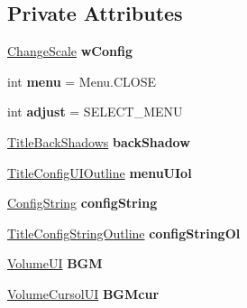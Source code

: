 \subsection*{Private Attributes}
\begin{DoxyCompactItemize}
\item 
\mbox{\label{class_config_af5660f71632e5a4ce5e62d26032c552d}} 
\hyperlink{class_change_scale}{Change\+Scale} {\bfseries w\+Config}
\item 
\mbox{\label{class_config_a0026c6b988c3a718f8dddb4055e5aa91}} 
int {\bfseries menu} = Menu.\+C\+L\+O\+SE
\item 
\mbox{\label{class_config_a28812054877c43591d28b47a0db1bd57}} 
int {\bfseries adjust} = S\+E\+L\+E\+C\+T\+\_\+\+M\+E\+NU
\item 
\mbox{\label{class_config_a5da8825027c61bdee5cda4b715470912}} 
\hyperlink{class_title_back_shadows}{Title\+Back\+Shadows} {\bfseries back\+Shadow}
\item 
\mbox{\label{class_config_aa9c554f5d5e582765859907797e0d358}} 
\hyperlink{class_title_config_u_i_outline}{Title\+Config\+U\+I\+Outline} {\bfseries menu\+U\+Iol}
\item 
\mbox{\label{class_config_af27c6e18005995591aa2bcd78c745803}} 
\hyperlink{class_config_string}{Config\+String} {\bfseries config\+String}
\item 
\mbox{\label{class_config_a4d89300834284da349f030bd6e4ae53f}} 
\hyperlink{class_title_config_string_outline}{Title\+Config\+String\+Outline} {\bfseries config\+String\+Ol}
\item 
\mbox{\label{class_config_a54b5fbf096f72f8071ef0550d88c20eb}} 
\hyperlink{class_volume_u_i}{Volume\+UI} {\bfseries B\+GM}
\item 
\mbox{\label{class_config_a7239d1465a3013f85a0819ec9a7bfbbe}} 
\hyperlink{class_volume_cursol_u_i}{Volume\+Cursol\+UI} {\bfseries B\+G\+Mcur}
\item 
\mbox{\label{class_config_a1644892a5342481a0bc1b54b786d1818}} 

\end{DoxyCompactItemize}
